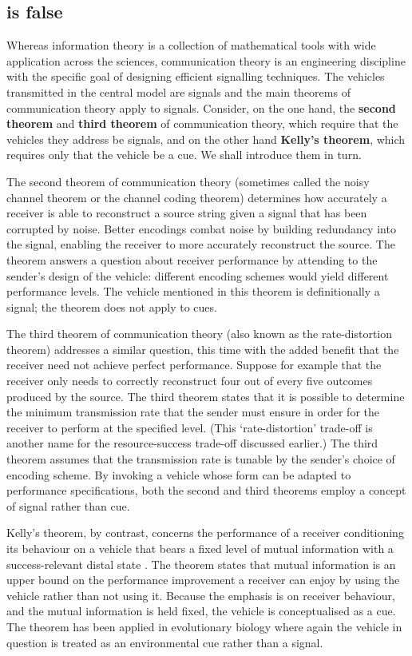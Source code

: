 \documentclass[12pt]{article}
\begin{document}
\subsection{\act{} is false}\label{subsec:actFalse}

Whereas information theory is a collection of mathematical tools with wide application across the sciences, communication theory is an engineering discipline with the specific goal of designing efficient signalling techniques.
The vehicles transmitted in the central model are signals and the main theorems of communication theory apply to signals.
Consider, on the one hand, the \textbf{second theorem} and \textbf{third theorem} of communication theory, which require that the vehicles they address be signals, and on the other hand \textbf{Kelly's theorem}, which requires only that the vehicle be a cue.
We shall introduce them in turn.

The second theorem of communication theory (sometimes called the noisy channel theorem or the channel coding theorem) determines how accurately a receiver is able to reconstruct a source string given a signal that has been corrupted by noise.
Better encodings combat noise by building redundancy into the signal, enabling the receiver to more accurately reconstruct the source.
The theorem answers a question about receiver performance by attending to the sender's design of the vehicle: different encoding schemes would yield different performance levels.
The vehicle mentioned in this theorem is definitionally a signal; the theorem does not apply to cues.

The third theorem of communication theory (also known as the rate-distortion theorem) addresses a similar question, this time with the added benefit that the receiver need not achieve perfect performance.
Suppose for example that the receiver only needs to correctly reconstruct four out of every five outcomes produced by the source.
The third theorem states that it is possible to determine the minimum transmission rate that the sender must ensure in order for the receiver to perform at the specified level.
(This `rate-distortion' trade-off is another name for the resource-success trade-off discussed earlier.)
The third theorem assumes that the transmission rate is tunable by the sender's choice of encoding scheme.
By invoking a vehicle whose form can be adapted to performance specifications, both the second and third theorems employ a concept of signal rather than cue.

Kelly's theorem, by contrast, concerns the performance of a receiver conditioning its behaviour on a vehicle that bears a fixed level of mutual information with a success-relevant distal state \citep{kelly1956new}.
The theorem states that mutual information is an upper bound on the performance improvement a receiver can enjoy by using the vehicle rather than not using it.
Because the emphasis is on receiver behaviour, and the mutual information is held fixed, the vehicle is conceptualised as a cue.
The theorem has been applied in evolutionary biology \citep{donaldson-matasci2010fitness} where again the vehicle in question is treated as an environmental cue rather than a signal.
\end{document}
